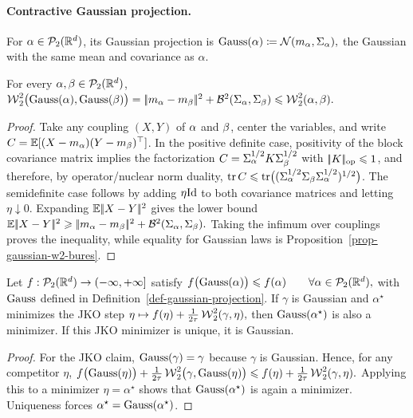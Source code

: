 \paragraph{Contractive Gaussian projection.}
\begin{defn}\label{def-gaussian-projection}
For \(\alpha\in\mathcal{P}_2(\mathbb{R}^d)\), its Gaussian projection is \(\operatorname{Gauss}(\alpha) \coloneqq \mathcal{N}(m_\alpha,\Sigma_\alpha),\)
the Gaussian with the same mean and covariance as \(\alpha\).
\end{defn}
\begin{thm}\label{thm-gelbrich-projection}
For every $\alpha,\beta\in\mathcal{P}_2(\mathbb{R}^d)$, \(\operatorname{\mathcal{W}}_2^2\bigl(\operatorname{Gauss}(\alpha),\operatorname{Gauss}(\beta)\bigr) = |\!| m_\alpha-m_\beta |\!|^2+\mathcal{B}^2(\Sigma_\alpha,\Sigma_\beta) \leqslant \operatorname{\mathcal{W}}_2^2(\alpha,\beta).\)
\end{thm}
\begin{proof}
Take any coupling $(X,Y)$ of $\alpha$ and $\beta$, center the variables, and write $C=\mathbb{E}[(X-m_\alpha)(Y-m_\beta)^\top]$. In the positive definite case, positivity of the block covariance matrix implies the factorization $C=\Sigma_\alpha^{1/2}K\Sigma_\beta^{1/2}$ with $|\!| K |\!|_{\mathrm{op}}\leqslant1$, and therefore, by operator/nuclear norm duality, $\operatorname{tr} C\leqslant \operatorname{tr}\bigl((\Sigma_\alpha^{1/2}\Sigma_\beta\Sigma_\alpha^{1/2})^{1/2}\bigr)$.
The semidefinite case follows by adding $\eta\mathrm{Id}$ to both covariance matrices and letting $\eta\downarrow0$.
Expanding $\mathbb{E}|\!| X-Y |\!|^2$ gives the lower bound
\(\mathbb{E}|\!| X-Y |\!|^2 \geqslant |\!| m_\alpha-m_\beta |\!|^2+\mathcal{B}^2(\Sigma_\alpha,\Sigma_\beta).\)
Taking the infimum over couplings proves the inequality, while equality for Gaussian laws is Proposition~\ref{prop-gaussian-w2-bures}.
\end{proof}
\begin{thm}\label{thm-lavenant-gaussian-preserving-jko}
Let $f:\mathcal{P}_2(\mathbb{R}^d)\to(-\infty,+\infty]$ satisfy
\(f\bigl(\operatorname{Gauss}(\alpha)\bigr)\leqslant f(\alpha) \qquad\forall\alpha\in\mathcal{P}_2(\mathbb{R}^d),\)
with $\operatorname{Gauss}$ defined in Definition~\ref{def-gaussian-projection}. If $\gamma$ is Gaussian and $\alpha^\star$ minimizes the JKO step
\(\eta\mapsto f(\eta)+\frac1{2\tau}\operatorname{\mathcal{W}}_2^2(\gamma,\eta),\)
then $\operatorname{Gauss}(\alpha^\star)$ is also a minimizer. If this JKO minimizer is unique, it is Gaussian.
\end{thm}
\begin{proof}
For the JKO claim, $\operatorname{Gauss}(\gamma)=\gamma$ because $\gamma$ is Gaussian. Hence, for any competitor $\eta$,
\(f\bigl(\operatorname{Gauss}(\eta)\bigr)+\frac1{2\tau}\operatorname{\mathcal{W}}_2^2\bigl(\gamma,\operatorname{Gauss}(\eta)\bigr) \leqslant f(\eta)+\frac1{2\tau}\operatorname{\mathcal{W}}_2^2(\gamma,\eta).\)
Applying this to a minimizer $\eta=\alpha^\star$ shows that $\operatorname{Gauss}(\alpha^\star)$ is again a minimizer. Uniqueness forces $\alpha^\star=\operatorname{Gauss}(\alpha^\star)$.
\end{proof}
